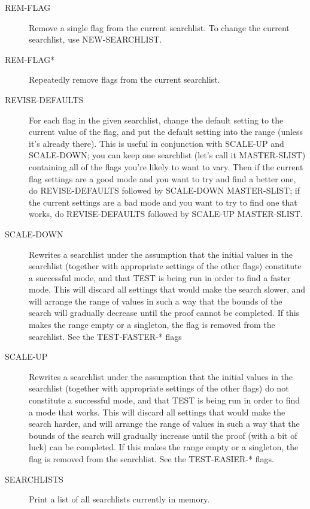 \begin{description}
\item[REM-FLAG]  
Remove a single flag from the current searchlist.
To change the current searchlist, use NEW-SEARCHLIST.

\item[REM-FLAG*]  
Repeatedly remove flags from the current searchlist.

\item[REVISE-DEFAULTS]  
For each flag in the given searchlist, change the default setting to 
the current value of the flag, and put the default setting into the range
(unless it's already there). This is useful in conjunction with SCALE-UP 
and SCALE-DOWN; you can keep one searchlist (let's call it MASTER-SLIST) 
containing all of the flags you're likely to want to vary. Then if the 
current flag settings are a good mode and you want to try and find a better 
one, do REVISE-DEFAULTS followed by SCALE-DOWN MASTER-SLIST; if the current
settings are a bad mode and you want to try to find one that works, do 
REVISE-DEFAULTS followed by SCALE-UP MASTER-SLIST.

\item[SCALE-DOWN]  
Rewrites a searchlist under the assumption that the initial
values in the searchlist (together with appropriate settings of the other
flags) constitute a successful mode, and that TEST is being run in order 
to find a faster mode. This will discard all settings that would make the
search slower, and will arrange the range of values in such a way that the
bounds of the search will gradually decrease until the proof cannot be 
completed. If this makes the range empty or a singleton, the flag is removed
from the searchlist. See the TEST-FASTER-* flags

\item[SCALE-UP]  
Rewrites a searchlist under the assumption that the initial
values in the searchlist (together with appropriate settings of the other
flags) do not constitute a successful mode, and that TEST is being run in order
to find a mode that works. This will discard all settings that would make the 
search harder, and will arrange the range of values in such a way that the 
bounds of the search will gradually increase until the proof (with a bit of 
luck) can be completed. If this makes the range empty or a singleton, the flag 
is removed from the searchlist. See the TEST-EASIER-* flags.

\item[SEARCHLISTS]  
Print a list of all searchlists currently in memory.


\end{description}
